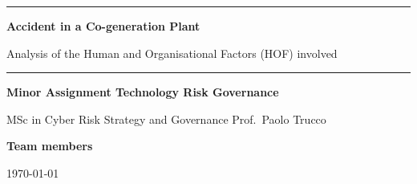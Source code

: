 \begin{titlepage}
  \thispagestyle{empty}
  \vspace*{1.6cm}
  {\color{polblue}\rule{\linewidth}{1.2pt}}\par\vspace{0.6cm}
  {\color{polblue}\fontsize{26}{32}\selectfont\bfseries Accident in a Co-generation Plant\par}
  \vspace{0.3cm}
  {\Large Analysis of the Human and Organisational Factors (HOF) involved\par}
  \vspace{0.6cm}
  {\color{polblue}\rule{\linewidth}{1.2pt}}\par\vspace{1.2cm}
  {\large\bfseries Minor Assignment \textbar{} Technology Risk Governance\par}
  \vspace{0.2cm}
  {\large MSc in Cyber Risk Strategy and Governance \textbar{} Prof.\ Paolo Trucco\par}
  \vspace{1.4cm}
  {\large\bfseries Team members\par}
  \vspace{0.2cm}
  {\large \TeamMembers\par}
  \vfill
  {\normalsize \ReportScope\par}
  \vspace{0.2cm}
  {\normalsize \today\par}
\end{titlepage}

